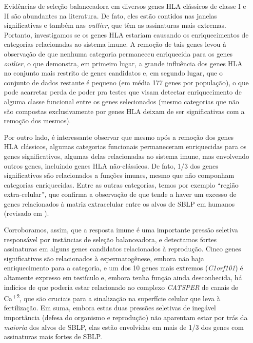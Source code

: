 \begin{refsection}
Evidências de seleção balanceadora em diversos genes HLA clássicos de classe I e II são abundantes na literatura. De fato, eles estão contidos nas janelas significativas  e também nas  \emph{outlier}, que têm as assinaturas mais extremas. Portanto, investigamos se os genes HLA estariam causando os enriquecimentos de categorias relacionadas ao sistema imune. A remoção de tais genes levou à observação de que nenhuma categoria permaneceu enriquecida para os genes \emph{outlier}, o que demonstra, em primeiro lugar, a grande influência dos genes HLA no conjunto mais restrito de genes candidatos e, em segundo lugar, que o conjunto de dados restante é pequeno (em média 177 genes por população), o que pode acarretar perda de poder pra testes que visam detectar enriquecimento de alguma classe funcional entre os genes selecionados (mesmo categorias que não são compostas exclusivamente por genes HLA deixam de ser significativas com a remoção dos mesmos).

Por outro lado, é interessante observar que mesmo após a remoção dos genes HLA clássicos, algumas categorias funcionais permaneceram enriquecidas para os genes significativos, algumas delas relacionadas ao sistema imune, mas envolvendo outros genes, incluindo genes HLA não-clássicos. De fato, 1/3 dos genes significativos são relacionados a funções imunes, mesmo que não componham categorias enriquecidas. Entre as outras categorias, temos por exemplo \enquote{região extra-celular}, que confirma a observação de que tende a haver um excesso de genes relacionados à matriz extracelular entre os alvos de SBLP em humanos (revisado em \cite{Key2014b}).

Corroboramos, assim, que a resposta imune é uma importante pressão seletiva responsável por instâncias de seleção balanceadora, e detectamos fortes assinaturas em alguns genes candidatos relacionados à reprodução. Cinco genes significativos são relacionados à espermatogênese, embora não haja enriquecimento para a categoria, e um dos 10 genes mais extremos (\emph{C1orf101}) é altamente expresso em testículo e, embora tenha função ainda desconhecida, há indícios de que poderia estar relacionado ao complexo \emph{CATSPER} de canais de Ca\textsuperscript{+2}, que são cruciais para a sinalização na superfície celular que leva à fertilização. Em suma, embora estas duas pressões seletivas de inegável importância (defesa do organismo e reprodução) não aparentam estar por trás da \emph{maioria} dos alvos de SBLP, elas estão envolvidas em mais de 1/3 dos genes com assinaturas mais fortes de SBLP.


\end{refsection}

